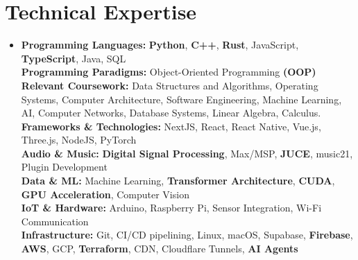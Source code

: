 \documentclass[letterpaper,11pt]{article}
\newcommand{\resumeItem}[1]{
  \item\small{
    {#1 \vspace{-2pt}}
  }
}
\newcommand{\resumeSubHeadingListStart}{\begin{itemize}[leftmargin=0.15in, label={}]}
\newcommand{\resumeSubHeadingListEnd}{\end{itemize}}
\begin{document}
\section{Technical Expertise}
\resumeSubHeadingListStart
  \resumeItem{
    \small{
      \textbf{Programming Languages:} \textbf{Python}, \textbf{C++}, \textbf{Rust}, JavaScript, \textbf{TypeScript}, Java, SQL\\[2pt]
      \textbf{Programming Paradigms:} Object-Oriented Programming \textbf{(OOP)}\\[2pt]
      \textbf{Relevant Coursework:} Data Structures and Algorithms, Operating Systems, Computer Architecture, Software Engineering, Machine Learning, AI, Computer Networks, Database Systems, Linear Algebra, Calculus.\\[2pt]
      \textbf{Frameworks & Technologies:} NextJS, React, React Native, Vue.js, Three.js, NodeJS, PyTorch\\[2pt]
      \textbf{Audio & Music:} \textbf{Digital Signal Processing}, Max/MSP, \textbf{JUCE}, music21, Plugin Development\\[2pt]
      \textbf{Data & ML:} Machine Learning, \textbf{Transformer Architecture}, \textbf{CUDA}, \textbf{GPU Acceleration}, Computer Vision\\[2pt]
      \textbf{IoT & Hardware:} Arduino, Raspberry Pi, Sensor Integration, Wi-Fi Communication\\[2pt]
      \textbf{Infrastructure:} Git, CI/CD pipelining, Linux, macOS, Supabase, \textbf{Firebase}, \textbf{AWS}, GCP, \textbf{Terraform}, CDN, Cloudflare Tunnels, \textbf{AI Agents}
      \\[-5pt]
    }
  }
\resumeSubHeadingListEnd
\vspace{-5pt}
\end{document}
